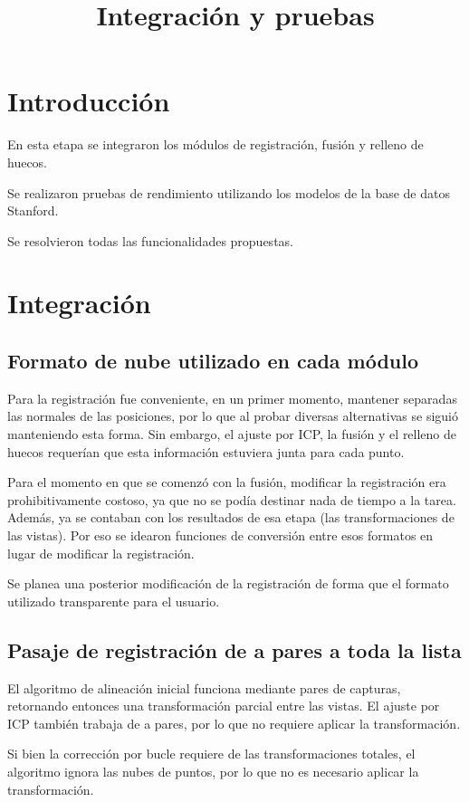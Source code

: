 \documentclass{pfc}
\title{Integración y pruebas}
\begin{document}
	\maketitle
	\section{Introducción}

	En esta etapa se integraron los módulos de registración, fusión y relleno de huecos.

	Se realizaron pruebas de rendimiento utilizando los modelos de la base de datos Stanford.

	Se resolvieron todas las funcionalidades propuestas.

	\section{Integración}
	\subsection{Formato de nube utilizado en cada módulo}
		Para la registración fue conveniente, en un primer momento, mantener
		separadas las normales de las posiciones, por lo que al probar diversas
		alternativas se siguió manteniendo esta forma.
		Sin embargo, el ajuste por ICP, la fusión y el relleno de huecos
		requerían que esta información estuviera junta para cada punto.

		Para el momento en que se comenzó con la fusión, modificar la
		registración era prohibitivamente costoso, ya que no se podía destinar nada de tiempo a la tarea.
		Además, ya se contaban con los resultados de esa etapa (las transformaciones de las vistas).
		Por eso se idearon funciones de conversión entre esos formatos en lugar de modificar la registración.

		Se planea una posterior modificación de la registración de forma que el
		formato utilizado transparente para el usuario.

	
	\subsection{Pasaje de registración de a pares a toda la lista}
		El algoritmo de alineación inicial funciona mediante pares de capturas,
		retornando entonces una transformación parcial entre las vistas.
		El ajuste por ICP también trabaja de a pares, por lo que no requiere aplicar la transformación.

		Si bien la corrección por bucle requiere de las transformaciones
		totales, el algoritmo ignora las nubes de puntos, por lo que no es
		necesario aplicar la transformación.
\end{document}
